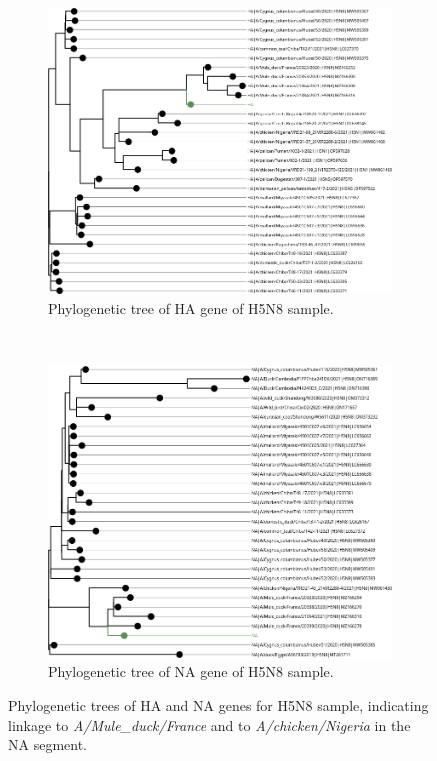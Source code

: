 \begin{figure}
    \centering
    \begin{subfigure}[]{0.5\textheight}
        \includegraphics[width=1.0\textwidth]{media/4-aiv-s8-tree-ha.png}
        \caption{Phylogenetic tree of HA gene of H5N8 sample.}
		\label{fig:apx-aiv-trees-s8-ha}
    \end{subfigure} \\ 
	\vspace*{20pt}
    \begin{subfigure}[]{0.5\textheight}
        \includegraphics[width=1.0\textwidth]{media/4-aiv-s8-tree-na.png}
        \caption{Phylogenetic tree of NA gene of H5N8 sample.}
		\label{fig:apx-aiv-trees-s8-na}
    \end{subfigure} 
	\caption[Phylogenetic trees of HA and NA genes for H5N8 sample.]{Phylogenetic trees of HA and NA genes for H5N8 sample, indicating linkage to \textit{A/Mule\_duck/France} and to \textit{A/chicken/Nigeria} in the NA segment.}
\label{fig:apx-aiv-trees-s8}
\end{figure}